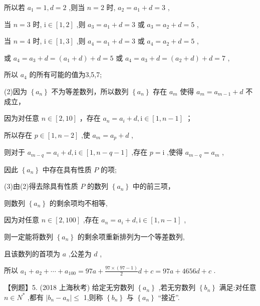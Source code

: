 \documentclass[10pt]{article}
\begin{document}
所以若 \({a}_{1} = 1,d = 2\) ,则当 \(n = 2\) 时, \({a}_{2} = {a}_{1} + d = 3\) ,

当 \(n = 3\) 时, \(\mathrm{i} \in  \left\lbrack  {1,2}\right\rbrack\) ,则 \({a}_{3} = {a}_{1} + d = 3\) 或 \({a}_{3} = {a}_{2} + d = 5\) ,

当 \(n = 4\) 时, \(\mathrm{i} \in  \left\lbrack  {1,3}\right\rbrack\) ,则 \({a}_{4} = {a}_{1} + d = 3\) 或 \({a}_{4} = {a}_{2} + d = 5\) ,

或 \({a}_{4} = {a}_{3} + d = \left( {{a}_{1} + d}\right)  + d = 5\) 或 \({a}_{4} = {a}_{3} + d = \left( {{a}_{2} + d}\right)  + d = 7\) ,

所以 \({a}_{4}\) 的所有可能的值为3,5,7;

(2)因为 \(\left\{  {a}_{n}\right\}\) 不为等差数列，所以数列 \(\left\{  {a}_{n}\right\}\) 存在 \({a}_{m}\) 使得 \({a}_{m} = {a}_{m - 1} + d\) 不成立，

因为对任意 \(n \in  \left\lbrack  {2,{10}}\right\rbrack\) ，存在 \({a}_{n} = {a}_{i} + d,\mathrm{i} \in  \left\lbrack  {1,n - 1}\right\rbrack\) ；

所以存在 \(p \in  \left\lbrack  {1,n - 2}\right\rbrack\) ,使 \({a}_{m} = {a}_{p} + d\) ,

则对于 \({a}_{m - q} = {a}_{i} + d,\mathrm{i} \in  \left\lbrack  {1,n - q - 1}\right\rbrack\) ,存在 \(p = \mathrm{i}\) ,使得 \({a}_{m - q} = {a}_{m}\) ,

因此 \(\left\{  {a}_{n}\right\}\) 中存在具有性质 \(P\) 的项;

(3)由(2)得去除具有性质 \(P\) 的数列 \(\left\{  {a}_{n}\right\}\) 中的前三项，

则数列 \(\left\{  {a}_{n}\right\}\) 的剩余项均不相等,

因为对任意 \(n \in  \left\lbrack  {2,{100}}\right\rbrack\) ,存在 \({a}_{n} = {a}_{i} + d,\mathrm{i} \in  \left\lbrack  {1,n - 1}\right\rbrack\) ,

则一定能将数列 \(\left\{  {a}_{n}\right\}\) 的剩余项重新排列为一个等差数列,

且该数列的首项为 \(a\) ,公差为 \(d\) ,

所以 \({a}_{1} + {a}_{2} + \cdots  + {a}_{100} = {97a} + \frac{{97} \times  \left( {{97} - 1}\right) }{2}d + c = {97a} + {4656d} + c\) .

【例题】5. (2018 上海秋考) 给定无穷数列 \(\left\{  {a}_{n}\right\}\) ,若无穷数列 \(\left\{  {b}_{n}\right\}\) 满足:对任意 \(n \in  {N}^{ * }\) ,都有 \(\left| {{b}_{n} - {a}_{n}}\right|  \leq\) 1,则称 \(\left\{  {b}_{n}\right\}\) 与 \(\left\{  {a}_{n}\right\}\) “接近”.
\end{document}
